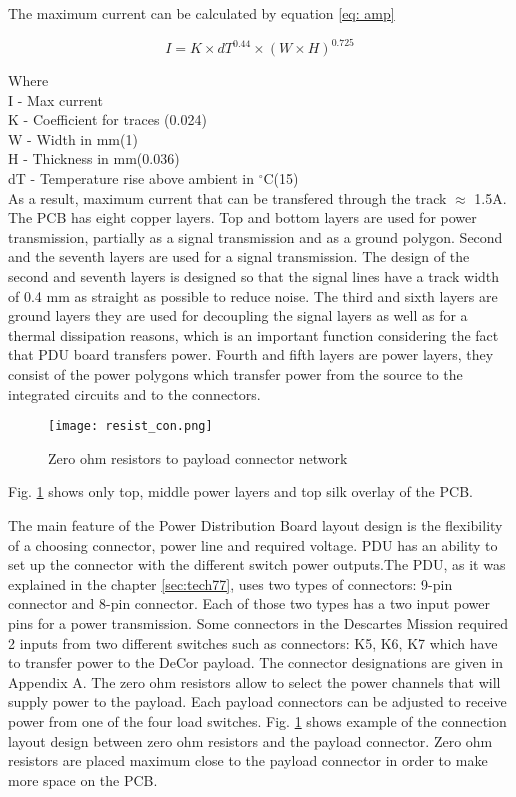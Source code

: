 The maximum current can be calculated by equation \ref{eq: amp}

\begin{equation}\label{eq: amp}
I = K \times dT^{0.44} \times (W \times H)^{0.725}
\end{equation}

Where\\

I - Max current\\
K - Coefficient for traces (0.024)\\
W - Width in mm(1)\\
H - Thickness in mm(0.036) \\
dT - Temperature rise above ambient in $^\circ$C(15)\\

As a result, maximum current that can be transfered through the track $\approx$ 1.5A.\\ 

The PCB  has eight copper layers. Top and bottom layers are used for power transmission, partially as a signal transmission and as a ground polygon. Second and the seventh layers are used for a signal transmission. The design of the second and seventh layers is designed so that the signal lines have a track width of 0.4 mm as straight as possible to reduce noise. The third and sixth layers are ground layers they are used for decoupling the signal layers as well as for a thermal dissipation reasons, which is an important function considering the fact that PDU board transfers power. Fourth and fifth layers are power layers, they consist of the power polygons which transfer power from the source to the integrated circuits and to the connectors.   

\begin{figure}[h]
	\centering
	\texttt{[image: resist\_con.png]}
	\caption{Zero ohm resistors to payload connector network}
	\label{fig: res}
\end{figure} 


Fig. \ref{fig: res} shows only top, middle power layers and top silk overlay of the PCB.

  
The main feature of the Power Distribution Board layout design is the flexibility of a choosing connector, power line and required voltage. PDU has an ability to set up the connector with the different switch power outputs.The PDU, as it was explained in the chapter \ref{sec:tech77}, uses two types of connectors: 9-pin connector and 8-pin connector. Each of those two types has a two input power pins for a power transmission.  Some connectors in the Descartes Mission required 2 inputs from two different switches such as connectors: K5, K6, K7 which have to transfer power to the DeCor payload. The connector designations are given in Appendix A. The zero ohm resistors allow to select the power channels that will supply power to the payload. Each payload connectors can be adjusted to receive power from one of the four load switches. Fig. \ref{fig: res} shows example of the connection layout design between zero ohm resistors and the payload connector. Zero ohm resistors are placed maximum close to the payload connector in order to make more space on the PCB. 

